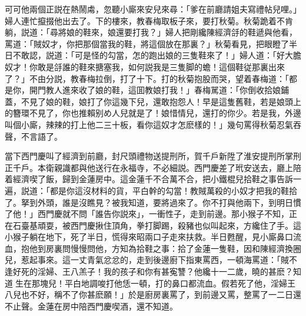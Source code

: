 可可他兩個正説在熱鬧䖏，忽聽小廝來安兒來尋：「爹在前廳請姐夫寫禮帖兒哩。」婦人連忙攛掇他出去了。下的樓來，教春梅取板子來，要打秋菊。秋菊跪着不肯躺，説道：「尋將娘的鞋來，娘還要打我？」婦人把剛纔陳經濟㧱的鞋遞與他看，罵道：「賊奴才，你把那個當我的鞋，將這個放在那裏？」秋菊看見，把眼瞪了半日不敢認，説道：「可是怪的勾當，怎的跑出娘的三隻鞋來了！」婦人道：「好大膽奴才！你敢是㧱誰的鞋來搪塞我，如何説我是三隻脚的蟾！這個鞋従那裏出來了？」不由分説，教春梅拉倒，打了十下。打的秋菊抱股而哭，望着春梅道：「都是你，開門教人進來收了娘的鞋，這囬教娘打我！」春梅駡道：「你倒收拾娘鋪蓋，不見了娘的鞋，娘打了你這幾下兒，還敢抱怨人！早是這隻舊鞋，若是娘頭上的簪環不見了，你也推賴别め人兒就是了！娘惜情兒，還打的你少。若是我，外邊叫個小廝，辣辣的打上他二三十板，看你這奴才怎麽樣的！」幾句罵得秋菊忍氣吞聲，不言語了。

當下西門慶叫了經濟到前廳，封尺頭禮物送提刑所，賀千戶新陞了淮安提刑所掌刑正千戶。本衛親識都與他送行在永福寺，不必細説。西門慶差了玳安送去，廳上陪着經濟喫了飯，歸到金蓮房中。這金蓮千不合萬不合，把小鐵棍兒拾鞋之事告訴一遍，説道：「都是你這沒材料的貨，平白幹的勾當！教賊萬殺的小奴才把我的鞋拾了。拏到外頭，誰是沒瞧見？被我知道，要將過來了。你不打與他兩下，到明日慣了他！」西門慶就不問「誰告你説來」，一衝性子，走到前邊。那小猴子不知，正在石臺基頑耍，被西門慶揪住頂角，拳打脚踢，殺豬也似叫起來，方纔住了手。這小猴子躺在地下，死了半日，慌得來昭兩口子走來扶救。半日甦醒，見小廝鼻口流血，抱他到房裏問慢慢問他，方知為拾鞋之事：拾了金蓮一隻鞋，因和陳經濟換圈兒，惹起事來。這一丈青氣忿忿的，走到後邊廚下指東罵西，一頓海罵道：「賊不逢好死的淫婦、王八羔子！我的孩子和你有甚寃讐？他纔十一二歲，曉的甚麽？知道𣭈生在那塊兒！平白地調唆打他恁一頓，打的鼻口都流血。假若死了他，淫婦王八兒也不好，稱不了你甚麽願！」於是廚房裏罵了，到前邊又罵，整罵了一二日還不止聲。金蓮在房中陪西門慶喫酒，還不知道。

